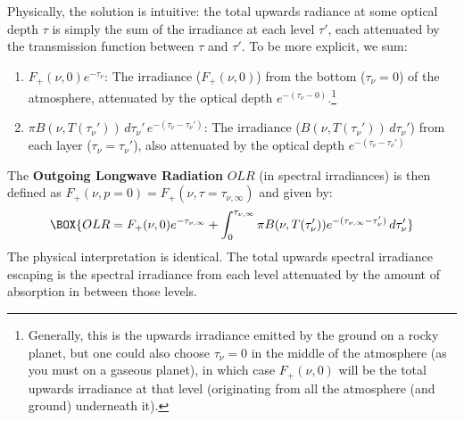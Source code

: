 Physically, the solution is intuitive: the total upwards radiance at some optical depth $\tau$ is simply the sum of the irradiance at each level $\tau'$, each attenuated by the transmission function between $\tau$ and $\tau'$. To be more explicit, we sum:
\begin{enumerate}
    \item $F_+(\nu,0)e^{-\tau_\nu}$: The irradiance ($F_+(\nu,0)$) from the bottom ($\tau_\nu=0$) of the atmosphere, attenuated by the optical depth $e^{-(\tau_\nu-0)}$.\footnote{Generally, this is the upwards irradiance emitted by the ground on a rocky planet, but one could also choose $\tau_\nu=0$ in the middle of the atmosphere (as you must on a gaseous planet), in which case $F_+(\nu,0)$ will be the total upwards irradiance at that level (originating from all the atmosphere (and ground) underneath it).}
    \item $\pi B(\nu,T(\tau_\nu'))\,d\tau_\nu'\,e^{-(\tau_\nu-\tau_\nu')}$: The irradiance ($B(\nu,T(\tau_\nu'))\,d\tau_\nu'$) from each layer ($\tau_\nu=\tau_\nu'$), also attenuated by the optical depth $e^{-(\tau_\nu-\tau_\nu')}$
\end{enumerate}
The \textbf{Outgoing Longwave Radiation} $OLR$ (in spectral irradiances) is then defined as $F_+(\nu,p=0)=F_+(\nu,\tau=\tau_{\nu,\infty})$ and given by:
\begin{align}
    \BOX{OLR=F_+(\nu,0)e^{-\tau_{\nu,\infty}}+\int_0^{\tau_{\nu,\infty}}\pi B(\nu,T(\tau_\nu'))e^{-(\tau_{\nu,\infty}-\tau_\nu')}\,d\tau_\nu'} \label{OLR Soln}
\end{align}
The physical interpretation is identical. The total upwards spectral irradiance escaping is the spectral irradiance from each level attenuated by the amount of absorption in between those levels.

